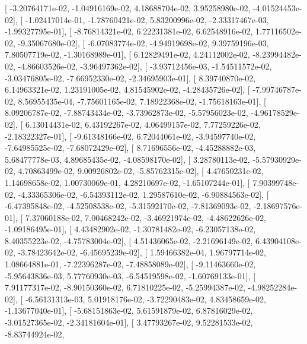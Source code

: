 \documentclass{article}
\begin{document}
       [ -3.20764171e-02,  -1.04916169e-02,   4.18688704e-02,
          3.95258980e-02,  -4.01524453e-02],
       [ -1.02417014e-01,  -1.78760421e-02,   5.83200996e-02,
         -2.33317467e-03,  -1.99327795e-01],
       [ -8.76814321e-02,   6.22231381e-02,   6.62548916e-02,
          1.77116502e-02,  -9.35067680e-02],
       [ -6.07083774e-02,  -4.94919698e-02,   9.39759196e-03,
          7.80507719e-02,  -1.30168989e-01],
       [  6.12829491e-02,   4.24112002e-02,  -8.23994482e-02,
         -4.86603526e-02,  -3.96497362e-02],
       [ -3.93712456e-03,  -1.54511572e-02,  -3.03476805e-02,
         -7.66952330e-02,  -2.34695903e-01],
       [  8.39740870e-02,   6.14963321e-02,   1.23191005e-02,
          4.81545902e-02,  -4.28435726e-02],
       [ -7.99746787e-02,   8.56955435e-04,  -7.75601165e-02,
          7.18922368e-02,  -1.75618163e-01],
       [  8.09206787e-02,  -7.88743434e-02,  -3.73962873e-02,
         -5.57956023e-02,  -4.96178529e-02],
       [  6.13014431e-02,   6.43192267e-02,   4.06499157e-02,
          7.77259226e-02,  -2.18322327e-01],
       [ -9.61348166e-02,   6.72044061e-02,  -3.94597740e-02,
         -7.64985525e-02,  -7.68072429e-02],
       [  8.71696556e-02,  -4.45288882e-03,   5.68477778e-03,
          4.89685435e-02,  -4.08598170e-02],
       [  3.28780113e-02,  -5.57930929e-02,   4.70863499e-02,
          9.00926802e-02,  -5.85762315e-02],
       [  4.47650231e-02,   1.14698658e-02,   1.00730069e-01,
          4.28210697e-02,  -1.65107244e-01],
       [  7.90399748e-02,  -4.33365306e-02,  -6.54393112e-02,
          1.29587610e-02,  -6.90884563e-02],
       [ -6.47395848e-02,  -4.52508538e-02,  -5.31592170e-02,
         -7.81369093e-02,  -2.18697576e-01],
       [  7.37060188e-02,   7.00468242e-02,  -3.46921974e-02,
         -4.48622626e-02,  -1.09186495e-01],
       [  4.43482902e-02,  -1.30781482e-02,  -6.23057138e-02,
          8.40355223e-02,  -4.75783004e-02],
       [  4.51436065e-02,  -2.21696149e-02,   6.43904108e-02,
         -3.78423642e-02,  -6.45695239e-02],
       [  1.59466382e-04,   1.96797714e-02,   1.08664881e-01,
         -7.22396287e-02,  -7.48858089e-02],
       [ -9.11463660e-02,  -5.95643836e-03,   5.77760930e-03,
         -6.54519598e-02,  -1.60769133e-01],
       [  7.91177317e-02,  -8.90150360e-02,   6.71810225e-02,
         -5.25994387e-02,  -4.98252284e-02],
       [ -6.56131313e-03,   5.01918176e-02,  -3.72290483e-02,
          4.83458659e-02,  -1.13677040e-01],
       [ -5.68151863e-02,   5.61591879e-02,   6.87816029e-02,
         -3.01527365e-02,  -2.34181604e-01],
       [  3.47793267e-02,   9.52281533e-02,  -8.83744924e-02,
\end{document}
